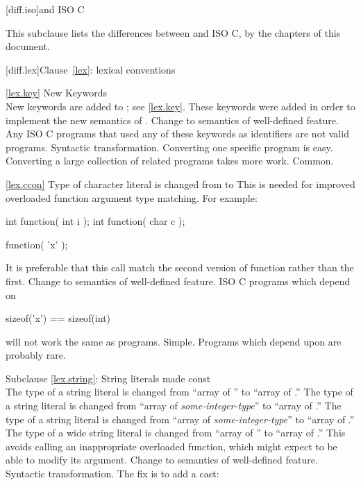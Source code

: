 
[diff.iso]{\Cpp and ISO C}

\pnum
{}%
This subclause lists the differences between \Cpp and
ISO C, by the chapters of this document.

[diff.lex]{Clause~\ref{lex}: lexical conventions}

\ref{lex.key}
\change New Keywords\\
New keywords are added to \Cpp;
see \ref{lex.key}.
\rationale
These keywords were added in order to implement the new
semantics of \Cpp.
\effect
Change to semantics of well-defined feature.
Any ISO C programs that used any of these keywords as identifiers
are not valid \Cpp programs.
\difficulty
Syntactic transformation.
Converting one specific program is easy.
Converting a large collection
of related programs takes more work.
\howwide
Common.

\ref{lex.ccon}
\change Type of character literal is changed from  to 
\rationale
This is needed for improved overloaded function argument type
matching.
For example:

\begin{codeblock}
int function( int i );
int function( char c );

function( 'x' );
\end{codeblock}

It is preferable that this call match the second version of
function rather than the first.
\effect
Change to semantics of well-defined feature.
ISO C programs which depend on

\begin{codeblock}
sizeof('x') == sizeof(int)
\end{codeblock}

will not work the same as \Cpp programs.
\difficulty
Simple.
\howwide
Programs which depend upon  are probably rare.

Subclause \ref{lex.string}:
\change String literals made const\\
The type of a string literal is changed
from ``array of ''
to ``array of .''
The type of a  string literal is changed
from ``array of \textit{some-integer-type}''
to ``array of .''
The type of a  string literal is changed
from ``array of \textit{some-integer-type}''
to ``array of .''
The type of a wide string literal is changed
from ``array of ''
to ``array of .''
\rationale
This avoids calling an inappropriate overloaded function,
which might expect to be able to modify its argument.
\effect
Change to semantics of well-defined feature.
\difficulty
Syntactic transformation. The fix is to add a cast:

